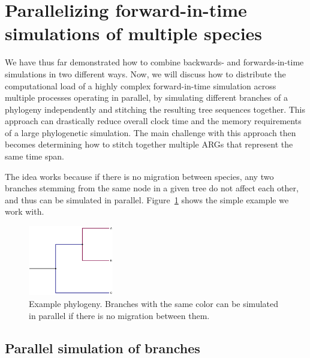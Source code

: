\documentclass[12pt]{article}
\begin{document}
\section{Parallelizing forward-in-time simulations of multiple species}

We have thus far demonstrated how to combine backwards- and forwards-in-time simulations
in two different ways.
Now, we will discuss how to distribute the computational load of a highly complex forward-in-time simulation across multiple processes operating in parallel,
by simulating different branches of a phylogeny independently
and stitching the resulting tree sequences together.
This approach can drastically reduce overall clock time and the memory requirements of a large phylogenetic simulation.
The main challenge with this approach then becomes
determining how to stitch together multiple ARGs that represent the same time span.

The idea works because if there is no migration between species,
any two branches stemming from the same node in a given tree do not affect each other,
and thus can be simulated in parallel.
Figure~\ref{fig:phylo} shows the simple example we work with.

\begin{figure}[h!]
    \centering
     \includegraphics[width=0.33\textwidth]{code/parallelizing_multiple_species/phylo.pdf}
     \caption{
         Example phylogeny.
         Branches with the same color can be simulated in parallel if there is no migration between them.
     }
     \label{fig:phylo}
\end{figure}

\subsection{Parallel simulation of branches}
\end{document}
